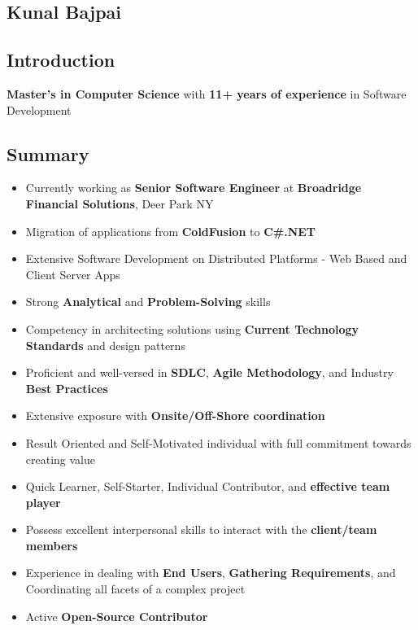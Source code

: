 \documentclass[letterpaper,11pt]{article}
\begin{document}
    \begin{center}
    \section{Kunal Bajpai}
    \end{center}

    \subsection{Introduction}
    \textbf{Master's in Computer Science} with \textbf{11+ years of experience} in Software Development

    \subsection{Summary}
    \begin{itemize}
        \item Currently working as \textbf{Senior Software Engineer} at \textbf{Broadridge Financial Solutions}, Deer Park NY
        \item Migration of applications from \textbf{ColdFusion} to \textbf{C\#.NET}
        \item Extensive Software Development on Distributed Platforms - Web Based and Client Server Apps
        \item Strong \textbf{Analytical} and \textbf{Problem-Solving} skills
        \item Competency in architecting solutions using \textbf{Current Technology Standards} and design patterns
        \item Proficient and well-versed in \textbf{SDLC}, \textbf{Agile Methodology}, and Industry \textbf{Best Practices}
        \item Extensive exposure with \textbf{Onsite/Off-Shore coordination}
        \item Result Oriented and Self-Motivated individual with full commitment towards creating value
        \item Quick Learner, Self-Starter, Individual Contributor, and \textbf{effective team player}
        \item Possess excellent interpersonal skills to interact with the \textbf{client/team members}
        \item Experience in dealing with \textbf{End Users}, \textbf{Gathering Requirements}, and Coordinating all facets of a complex project
        \item Active \textbf{Open-Source Contributor}
    \end{itemize}
\end{document}
